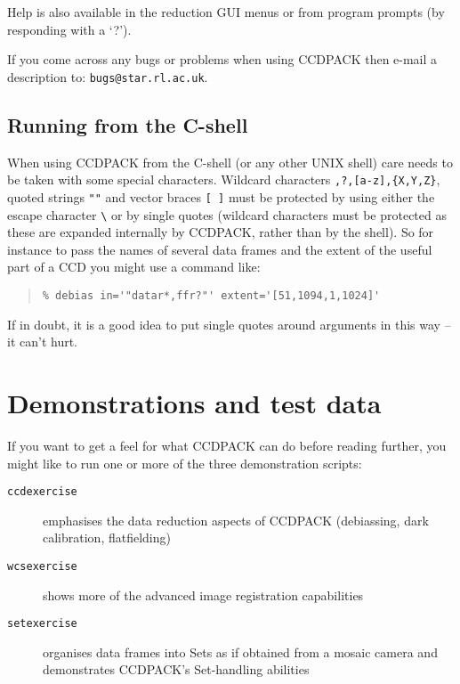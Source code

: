 \documentclass[twoside,11pt]{article}
\newcommand{\latexhtml}[2]{#1}
\newcommand{\xlabel}[1]{}
\renewcommand{\_}{\texttt{\symbol{95}}}
\newcommand{\ttsize}{\latexhtml{\small}{}}
\newenvironment{myquote}{\begin{quote}\ttsize}{\end{quote}}
\newcommand{\text}[1]{{\ttsize \tt #1}}
\begin{document}
Help is also available in the reduction GUI menus or from program
prompts (by responding with a `?').

If you come across any bugs or problems when using CCDPACK then e-mail
a description to: \texttt{bugs@star.rl.ac.uk}.

\subsection{Running from the C-shell}
When using CCDPACK from the C-shell (or any other UNIX shell) care needs to
be taken with some special characters.
Wildcard characters \text{*,?,[a-z],\{X,Y,Z\}}, quoted strings \text{""}
and vector braces \text{[ ]} must be protected by using either the
escape character {\verb+\+} or by single quotes (wildcard characters
must be protected as these are expanded internally by CCDPACK, rather than by
the shell).
So for instance to pass the names of several data frames and the extent
of the useful part of a CCD you might use a command like:
\begin{myquote}
\begin{verbatim}
% debias in='"datar*,ffr?"' extent='[51,1094,1,1024]'
\end{verbatim}
\end{myquote}
If in doubt, it is a good idea to put single quotes around arguments 
in this way -- it can't hurt.

\section{\xlabel{demos}\label{demos}Demonstrations and test data}

If you want to get a feel for what CCDPACK can do before reading 
further, you might like to run one or more of the three 
demonstration scripts:
\begin{description}
\item[{\tt ccdexercise}]
emphasises the data reduction aspects of CCDPACK (debiassing,
dark calibration, flatfielding)
\item[{\tt wcsexercise}]
shows more of the advanced image registration capabilities
\item[{\tt setexercise}]
organises data frames into Sets as if obtained from a mosaic camera
and demonstrates CCDPACK's Set-handling abilities
\end{description}
\end{document}
